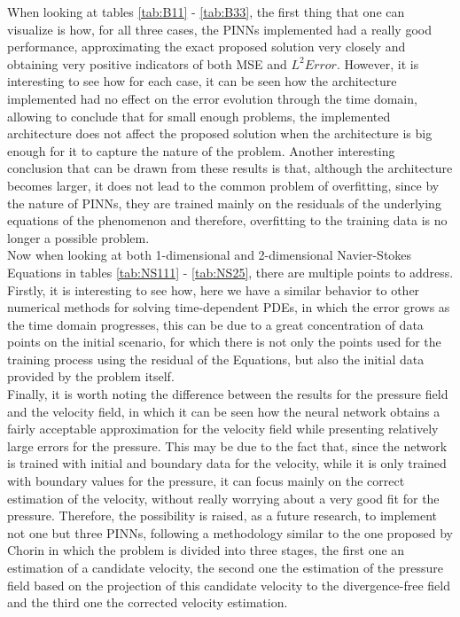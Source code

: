 \documentclass[12pt,letterpaper]{article}
\begin{document}
  When looking at tables \ref{tab:B11} - \ref{tab:B33}, the first thing that one can visualize is how, for all three cases, the PINNs implemented had a really good performance, approximating the exact proposed solution very closely and obtaining very positive indicators of both MSE and $L^2 Error$. However, it is interesting to see how for each case, it can be seen how the architecture implemented had no effect on the error evolution through the time domain, allowing to conclude that for small enough problems, the implemented architecture does not affect the proposed solution when the architecture is big enough for it to capture the nature of the problem. Another interesting conclusion that can be drawn from these results is that, although the architecture becomes larger, it does not lead to the common problem of overfitting, since by the nature of PINNs, they are trained mainly on the residuals of the underlying equations of the phenomenon and therefore, overfitting to the training data is no longer a possible problem.\\

  Now when looking at both 1-dimensional and 2-dimensional Navier-Stokes Equations in tables \ref{tab:NS111} - \ref{tab:NS25}, there are multiple points to address. Firstly, it is interesting to see how, here we have a similar behavior to other numerical methods for solving time-dependent PDEs, in which the error grows as the time domain progresses, this can be due to a great concentration of data points on the initial scenario, for which there is not only the points used for the training process using the residual of the Equations, but also the initial data provided by the problem itself.\\

  Finally, it is worth noting the difference between the results for the pressure field and the velocity field, in which it can be seen how the neural network obtains a fairly acceptable approximation for the velocity field while presenting relatively large errors for the pressure. This may be due to the fact that, since the network is trained with initial and boundary data for the velocity, while it is only trained with boundary values for the pressure, it can focus mainly on the correct estimation of the velocity, without really worrying about a very good fit for the pressure. Therefore, the possibility is raised, as a future research, to implement not one but three PINNs, following a methodology similar to the one proposed by Chorin \cite{chorin1968numerical} in which the problem is divided into three stages, the first one an estimation of a candidate velocity, the second one the estimation of the pressure field based on the projection of this candidate velocity to the divergence-free field and the third one the corrected velocity estimation.
\end{document}
